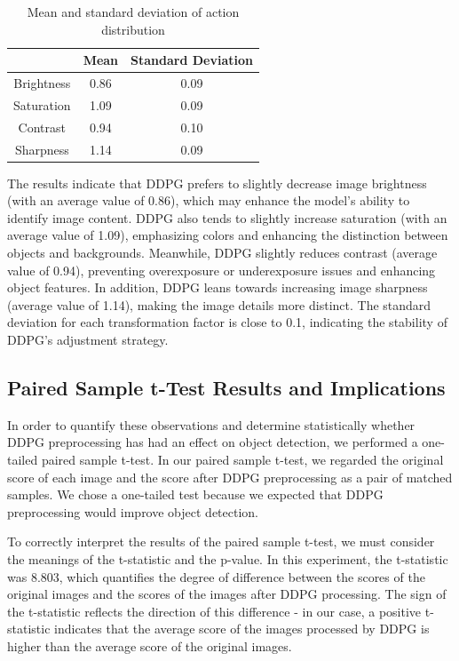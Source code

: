 \documentclass{PHlab-thesis}
\begin{document}
\begin{table}[H]
    \centering
    \caption{Mean and standard deviation of action distribution}
    \label{table:Test action distribution}
    \begin{tabular}{ccc}
        \toprule
        & \textbf{Mean} & \textbf{Standard Deviation} \\
        \midrule
        Brightness & 0.86 & 0.09 \\
        Saturation & 1.09 & 0.09 \\
        Contrast & 0.94 & 0.10 \\
        Sharpness & 1.14 & 0.09 \\
        \bottomrule
    \end{tabular}
\end{table}

The results indicate that DDPG prefers to slightly decrease image brightness (with an average value of 0.86), which may enhance the model's ability to identify image content. DDPG also tends to slightly increase saturation (with an average value of 1.09), emphasizing colors and enhancing the distinction between objects and backgrounds. Meanwhile, DDPG slightly reduces contrast (average value of 0.94), preventing overexposure or underexposure issues and enhancing object features. In addition, DDPG leans towards increasing image sharpness (average value of 1.14), making the image details more distinct. The standard deviation for each transformation factor is close to 0.1, indicating the stability of DDPG's adjustment strategy.

\subsection{Paired Sample t-Test Results and Implications}
In order to quantify these observations and determine statistically whether DDPG preprocessing has had an effect on object detection, we performed a one-tailed paired sample t-test. In our paired sample t-test, we regarded the original score of each image and the score after DDPG preprocessing as a pair of matched samples. We chose a one-tailed test because we expected that DDPG preprocessing would improve object detection.

To correctly interpret the results of the paired sample t-test, we must consider the meanings of the t-statistic and the p-value. In this experiment, the t-statistic was 8.803, which quantifies the degree of difference between the scores of the original images and the scores of the images after DDPG processing. The sign of the t-statistic reflects the direction of this difference - in our case, a positive t-statistic indicates that the average score of the images processed by DDPG is higher than the average score of the original images.
\end{document}
